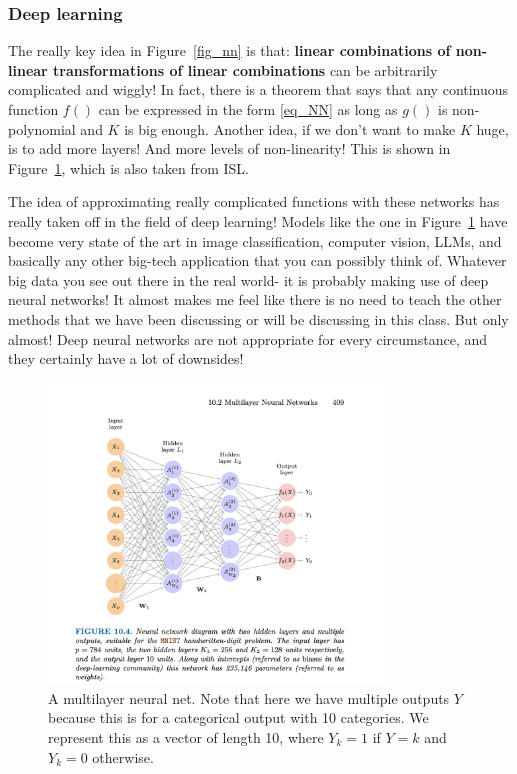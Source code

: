 \subsubsection{Deep learning}

The really key idea in Figure~\ref{fig_nn} is that: \textbf{linear combinations of non-linear transformations of linear combinations} can be arbitrarily complicated and wiggly! In fact, there is a theorem that says that any continuous function $f()$ can be expressed in the form \eqref{eq_NN} as long as $g()$ is non-polynomial and $K$ is big enough. Another idea, if we don't want to make $K$ huge, is to add more layers! And more levels of non-linearity! This is shown in Figure~\ref{fig_deep}, which is also taken from ISL. 

The idea of approximating really complicated functions with these networks has really taken off in the field of deep learning! Models like the one in Figure~\ref{fig_deep} have become very state of the art in image classification, computer vision, LLMs, and basically any other big-tech application that you can possibly think of. Whatever big data you see out there in the real world- it is probably making use of deep neural networks! It almost makes me feel like there is no need to teach the other methods that we have been discussing or will be discussing in this class. But only almost! Deep neural networks are not appropriate for every circumstance, and they certainly have a lot of downsides!  

\begin{figure}[h]
\centering
\includegraphics[width=0.8\textwidth]{442_lecs/deep.png}
\caption{A multilayer neural net. Note that here we have multiple outputs $Y$ because this is for a categorical output with 10 categories. We represent this as a vector of length 10, where $Y_k=1$ if $Y=k$ and $Y_k=0$ otherwise.}
\label{fig_deep}
\end{figure} 

